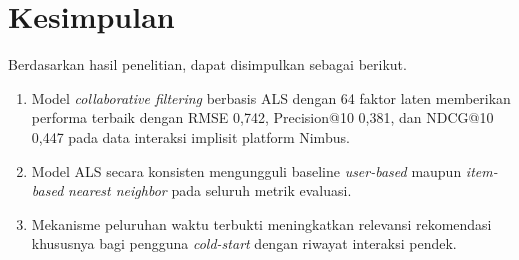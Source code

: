 \section{Kesimpulan}
Berdasarkan hasil penelitian, dapat disimpulkan sebagai berikut.
\begin{enumerate}
  \item Model \emph{collaborative filtering} berbasis ALS dengan 64 faktor
    laten memberikan performa terbaik dengan RMSE 0,742, Precision@10
    0,381, dan NDCG@10 0,447 pada data interaksi implisit platform Nimbus.
  \item Model ALS secara konsisten mengungguli baseline \emph{user-based}
    maupun \emph{item-based} \emph{nearest neighbor} pada seluruh metrik
    evaluasi.
  \item Mekanisme peluruhan waktu terbukti meningkatkan relevansi
    rekomendasi khususnya bagi pengguna \emph{cold-start} dengan riwayat
    interaksi pendek.
\end{enumerate}
